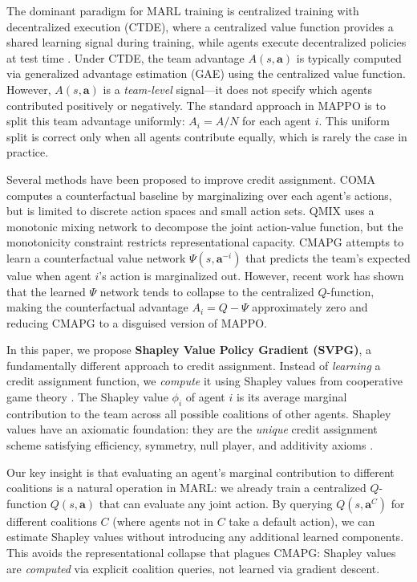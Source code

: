 \documentclass[11pt,a4paper]{article}
\begin{document}
The dominant paradigm for MARL training is centralized training with decentralized execution (CTDE), where a centralized value function provides a shared learning signal during training, while agents execute decentralized policies at test time \cite{foerster2018counterfactual, rashid2018qmix, yu2022surprising}. Under CTDE, the team advantage $A(s,\mathbf{a})$ is typically computed via generalized advantage estimation (GAE) \cite{schulman2016gae} using the centralized value function. However, $A(s,\mathbf{a})$ is a \emph{team-level} signal---it does not specify which agents contributed positively or negatively. The standard approach in MAPPO \cite{yu2022surprising} is to split this team advantage uniformly: $A_i = A / N$ for each agent $i$. This uniform split is correct only when all agents contribute equally, which is rarely the case in practice.

Several methods have been proposed to improve credit assignment. COMA \cite{foerster2018counterfactual} computes a counterfactual baseline by marginalizing over each agent's actions, but is limited to discrete action spaces and small action sets. QMIX \cite{rashid2018qmix} uses a monotonic mixing network to decompose the joint action-value function, but the monotonicity constraint restricts representational capacity. CMAPG \citep{cmapg2024} attempts to learn a counterfactual value network $\Psi(s, \mathbf{a}^{-i})$ that predicts the team's expected value when agent $i$'s action is marginalized out. However, recent work has shown that the learned $\Psi$ network tends to collapse to the centralized $Q$-function, making the counterfactual advantage $A_i = Q - \Psi$ approximately zero and reducing CMAPG to a disguised version of MAPPO.

In this paper, we propose \textbf{Shapley Value Policy Gradient (SVPG)}, a fundamentally different approach to credit assignment. Instead of \emph{learning} a credit assignment function, we \emph{compute} it using Shapley values from cooperative game theory \cite{shapley1953value}. The Shapley value $\phi_i$ of agent $i$ is its average marginal contribution to the team across all possible coalitions of other agents. Shapley values have an axiomatic foundation: they are the \emph{unique} credit assignment scheme satisfying efficiency, symmetry, null player, and additivity axioms \cite{shapley1953value}.

Our key insight is that evaluating an agent's marginal contribution to different coalitions is a natural operation in MARL: we already train a centralized $Q$-function $Q(s, \mathbf{a})$ that can evaluate any joint action. By querying $Q(s, \mathbf{a}^C)$ for different coalitions $C$ (where agents not in $C$ take a default action), we can estimate Shapley values without introducing any additional learned components. This avoids the representational collapse that plagues CMAPG: Shapley values are \emph{computed} via explicit coalition queries, not learned via gradient descent.
\end{document}
